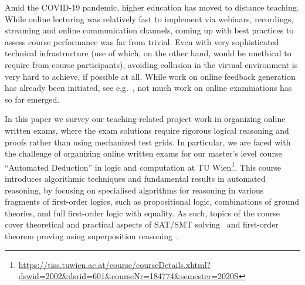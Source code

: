 Amid the COVID-19 pandemic, higher education has moved to distance
teaching. While online lecturing was relatively fast to implement via
webinars, recordings,  streaming and online communication channels,
coming up with best practices to assess course performance was far
from trivial. Even with very sophisticated technical infrastructure
(use of which, on the other hand, would be unethical to require from course
participants), avoiding collusion in the virtual
environment is very hard to achieve, if possible at all.
While work on
online feedback generation has already been initiated, see
e.g.~\cite{Zuleger18,Wang18}, 
not much work on online examinations has so far emerged. 

In this paper we survey our teaching-related project work in organizing online
written exams, where the exam solutions require rigorous
logical reasoning and proofs rather than using mechanized test grids.
In particular, we are faced with the challenge of organizing online
written exams for our master's level course ``Automated
Deduction'' in logic and computation at TU
Wien\footnote{\url{https://tiss.tuwien.ac.at/course/courseDetails.xhtml?dswid=2002\&dsrid=601\&courseNr=184774\&semester=2020S}}.
This course introduces algorithmic techniques and fundamental results
in automated reasoning, by focusing on specialised algorithms for
reasoning in various fragments of first-order logics, such as
propositional logic, combinations of ground theories, and full
first-order logic with equality.
As such, topics of the course cover theoretical and practical
aspects of SAT/SMT solving~\cite{DPLL,Tinelli02,DPLLT} and first-order theorem proving using
superposition reasoning~\cite{Rubio01,Vampire13}.

